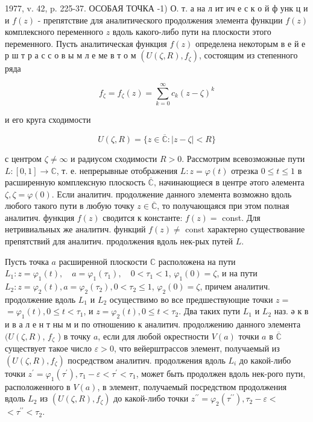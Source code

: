 \documentclass[10pt]{article}
\begin{document}
1977, v. 42, p. 225-37. ОСОБАЯ ТОЧКА -1) О. т. а на л ит ич е с к о й ф унк ц и и $f(z)$ - препятствие для аналитического продолжения элемента функции $f(z)$ комплексного переменного $z$ вдоль какого-либо пути на плоскости этого переменного. Пусть аналитическая функция $f(z)$ определена некоторым в е й е р ш т р а с с о в ы м л е ме в т о м $\left(U(\zeta, R), f_{\zeta}\right)$, состоящим из степенного ряда



\[

f_{\zeta}=f_{\zeta}(z)=\sum_{k=0}^{\infty} c_{k}(z-\zeta)^{k}

\]



и его круга сходимости



\[

U(\zeta, R)=\{z \in \overline{\mathbb{C}}:|z-\zeta|<R\}

\]



с центром $\zeta \neq \infty$ и радиусом сходимости $R>0$. Рассмотрим всевозможные пути $L:[0,1] \rightarrow \mathbb{C}$, т. е. непрерывные отображения $L: z=\varphi(t)$ отрезка $0 \leqslant t \leqslant 1$ в расширенную комплексную плоскость $\overline{\mathbb{C}}$, начинающиеся в центре әтого әлемента $\zeta, \zeta=\varphi(0)$. Если аналитич. продолжение данного элемента возможно вдоль любого такого пути в любую точку $z \in \overline{\mathbb{C}}$, то получающаяся при этом полная аналитич. функция $f(z)$ сводится к константе: $f(z)=$ const. Для нетривиальных же аналитич. функций $f(z) \neq$ const характерно существование препятствий для аналитич. продолжения вдоль нек-рых путей $L$.



Пусть точка $a$ расширенной плоскости $\mathbb{C}$ расположена на пути $L_{1}: z=\varphi_{1}(t), \quad a=\varphi_{1}\left(\tau_{1}\right), \quad 0<\tau_{1}<1$, $\varphi_{1}(0)=\zeta$, и на пути $L_{2}: z=\varphi_{2}(t), a=\varphi_{2}\left(\tau_{2}\right), 0<\tau_{2} \leqslant 1$, $\varphi_{2}(0)=\zeta$, причем аналитич. продолжение вдоль $L_{1}$ и $L_{2}$ осуществимо во все предшествующие точки $z=$ $=\varphi_{1}(t), 0 \leqslant t<\tau_{1}$, и $z=\varphi_{2}(t), 0 \leqslant t<\tau_{2}$. Два таких пути $L_{1}$ и $L_{2}$ наз. ә к в и в а л е н т ны м и по отношению к аналитич. продолжению данного элемента $(U(\zeta, R)$, $f_{\zeta}$ ) в точку $a$, если для любой окрестности $V(a)$ точки $a$ в $\overline{\mathbb{C}}$ существует такое число $\varepsilon>0$, что вейерштрассов элемент, получаемый из $\left(U(\zeta, R), f_{\zeta}\right)$ посредством аналитич. продолжения вдоль $L_{i}$ до какой-либо точки $z^{\prime}=\varphi_{1}\left(\tau^{\prime}\right), \tau_{1}-\varepsilon<\tau^{\prime}<\tau_{1}$, может быть продолжен вдоль нек-рого пути, расположенного в $V(a)$, в элемент, получаемый посредством продолжения вдоль $L_{2}$ из $\left(U(\zeta, R), f_{\zeta}\right)$ до какой-либо точки $z^{\prime \prime}=\varphi_{2}\left(\tau^{\prime \prime}\right), \tau_{2}-\varepsilon<$ $<\tau^{\prime \prime}<\tau_{2}$.
\end{document}
